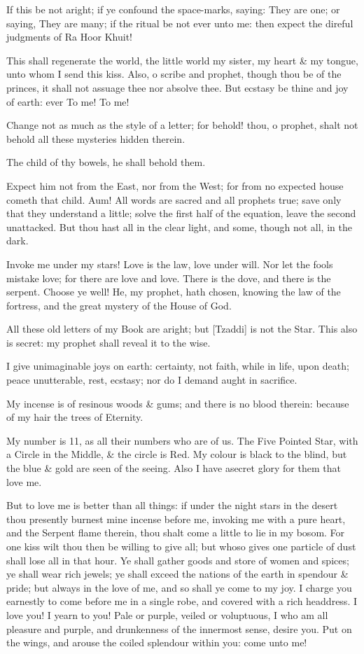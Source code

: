 If this be not aright; if ye confound the space-marks, saying: They are one; or saying, They are many; if the ritual be not ever unto me: then expect the direful judgments of Ra Hoor Khuit!

This shall regenerate the world, the little world my sister, my heart \& my tongue, unto whom I send this kiss. Also, o scribe and prophet, though thou be of the princes, it shall not assuage thee nor absolve thee. But ecstasy be thine and joy of earth: ever To me! To me!

Change not as much as the style of a letter; for behold! thou, o prophet, shalt not behold all these mysteries hidden therein.

The child of thy bowels, he shall behold them.

Expect him not from the East, nor from the West; for from no expected house cometh that child. Aum! All words are sacred and all prophets true; save only that they understand a little; solve the first half of the equation, leave the second unattacked. But thou hast all in the clear light, and some, though not all, in the dark.

Invoke me under my stars! Love is the law, love under will. Nor let the fools mistake love; for there are love and love. There is the dove, and there is the serpent. Choose ye well! He, my prophet, hath chosen, knowing the law of the fortress, and the great mystery of the House of God.\par
All these old letters of my Book are aright; but [Tzaddi] is not the Star. This also is secret: my prophet shall reveal it to the wise.

I give unimaginable joys on earth: certainty, not faith, while in life, upon death; peace unutterable, rest, ecstasy; nor do I demand aught in sacrifice.

My incense is of resinous woods \& gums; and there is no blood therein: because of my hair the trees of Eternity.

My number is 11, as all their numbers who are of us. The Five Pointed Star, with a Circle in the Middle, \& the circle is Red. My colour is black to the blind, but the blue \& gold are seen of the seeing. Also I have asecret glory for them that love me.

But to love me is better than all things: if under the night stars in the desert thou presently burnest mine incense before me, invoking me with a pure heart, and the Serpent flame therein, thou shalt come a little to lie in my bosom. For one kiss wilt thou then be willing to give all; but whoso gives one particle of dust shall lose all in that hour. Ye shall gather goods and store of women and spices; ye shall wear rich jewels; ye shall exceed the nations of the earth in spendour \& pride; but always in the love of me, and so shall ye come to my joy. I charge you earnestly to come before me in a single robe, and covered with a rich headdress. I love you! I yearn to you! Pale or purple, veiled or voluptuous, I who am all pleasure and purple, and drunkenness of the innermost sense, desire you. Put on the wings, and arouse the coiled splendour within you: come unto me!

